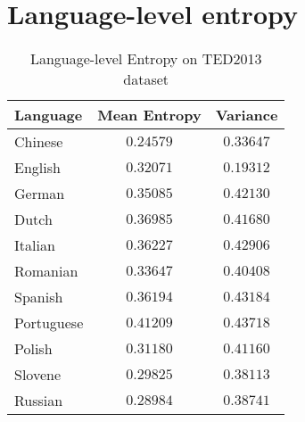 \section{Language-level entropy}
\label{App:lang_level_entropy_TED}
\begin{table}[ht]
    \centering
    \caption{Language-level Entropy on TED2013 dataset}
    \begin{tabular}{lcc}
        \toprule
        \textbf{Language} & \textbf{Mean Entropy} & \textbf{Variance} \\
        \midrule
        Chinese & $0.24579$ & $0.33647$ \\ \hline
        English & $0.32071$ & $0.19312$ \\
        German & $0.35085$ & $0.42130$ \\
        Dutch & $0.36985$ & $0.41680$ \\ \hline
        Italian & $0.36227$ & $0.42906$ \\
        Romanian & $0.33647$ & $0.40408$ \\
        Spanish & $0.36194$ & $0.43184$ \\
        Portuguese & $0.41209$ & $0.43718$ \\ \hline
        Polish & $0.31180$ & $0.41160$ \\
        Slovene & $0.29825$ & $0.38113$ \\
        Russian & $0.28984$ & $0.38741$ \\
        \bottomrule
    \end{tabular}
\end{table}


